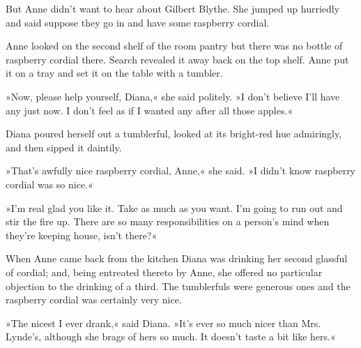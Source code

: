 But Anne didn't want to hear about Gilbert Blythe. She jumped up hurriedly and said suppose they go in and have some raspberry cordial.

Anne looked on the second shelf of the room pantry but there was no bottle of raspberry cordial there. Search revealed it away back on the top shelf. Anne put it on a tray and set it on the table with a tumbler.

»Now, please help yourself, Diana,« she said politely. »I don't believe I'll have any just now. I don't feel as if I wanted any after all those apples.«

Diana poured herself out a tumblerful, looked at its bright-red hue admiringly, and then sipped it daintily.

»That's awfully nice raspberry cordial, Anne,« she said. »I didn't know raspberry cordial was so nice.«

»I'm real glad you like it. Take as much as you want. I'm going to run out and stir the fire up. There are so many responsibilities on a person's mind when they're keeping house, isn't there?«

When Anne came back from the kitchen Diana was drinking her second glassful of cordial; and, being entreated thereto by Anne, she offered no particular objection to the drinking of a third. The tumblerfuls were generous ones and the raspberry cordial was certainly very nice.

»The nicest I ever drank,« said Diana. »It's ever so much nicer than Mrs. Lynde's, although she brags of hers so much. It doesn't taste a bit like hers.«

